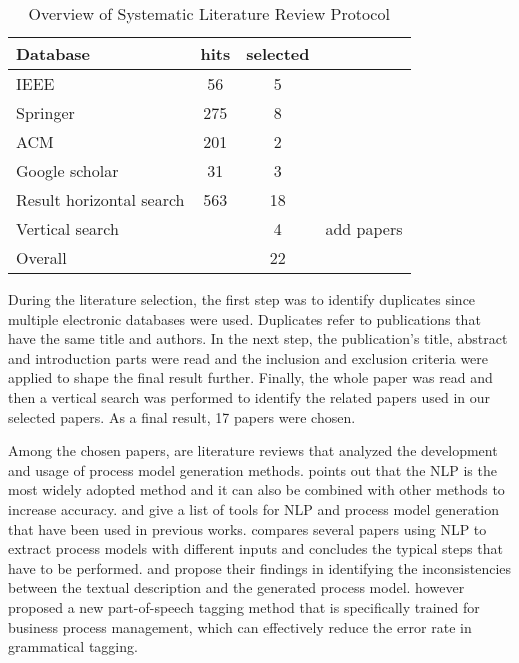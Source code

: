 	\begin{table}[]
		\begin{center}
		\caption{\centering Overview of Systematic Literature Review Protocol}
		\begin{tabular}{lccl}
    	\textbf{Database}\hspace{30mm} & \textbf{hits} & \textbf{selected} &  \\
    	\hline
		IEEE                     		& 56   & 5   &      		\\
		Springer                 		& 275  & 8   &      		\\
		ACM                      		& 201  & 2   &      		\\
		Google scholar           		& 31   & 3   &      		\\
		\hline
		Result horizontal search	 	& 563  & 18  &      		\\
		Vertical search          		&      & 4   &  \hspace{5mm}add papers  \\
		\hline
		Overall                  		&      & 22   &     
		\end{tabular}
		\end{center}
	\end{table}
	
	During the literature selection, the first step was to identify duplicates since multiple electronic databases were used. Duplicates refer to publications that have the same title and authors. In the next step, the publication's title, abstract and introduction parts were read and the inclusion and exclusion criteria were applied to shape the final result further. Finally, the whole paper was read and then a vertical search was performed to identify the related papers used in our selected papers. As a final result, 17 papers were chosen. 
	
	Among the chosen papers, \cite{literature_review_1} \cite{literature_review_2} \cite{literature_review_3} \cite{literature_review_4} are literature reviews that analyzed the development and usage of process model generation methods. \cite{literature_review_3} points out that the NLP is the most widely adopted method and it can also be combined with other methods to increase accuracy. \cite{literature_review_1} and \cite{literature_review_3} give a list of tools for NLP and process model generation that have been used in previous works. \cite{literature_review_4} compares several papers using NLP to extract process models with different inputs and concludes the typical steps that have to be performed. \cite{complement_2} and \cite{complement_3} propose their findings in identifying the inconsistencies between the textual description and the generated process model. \cite{complement_4} however proposed a new part-of-speech tagging method that is specifically trained for business process management, which can effectively reduce the error rate in grammatical tagging.
	
